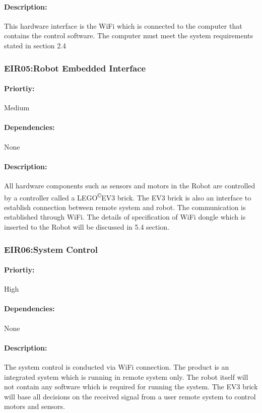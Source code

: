 \documentclass[10pt,a4paper,titlepage]{article}
\newcommand{\cpright}{\textsuperscript{\tiny\copyright}}
\begin{document}
	\paragraph{Description:} This hardware interface is the WiFi which is connected to the computer that contains the control software. The computer must meet the system requirements stated in section 2.4
	
	\subsubsection*{EIR05:Robot Embedded Interface}
	\paragraph{Priortiy:} Medium
	\paragraph{Dependencies:} None
	\paragraph{Description:} All hardware components such as sensors and motors in the Robot are controlled by a controller called a LEGO\cpright EV3 brick. The EV3 brick is also an interface to establish connection between remote system and robot. The communication is established through WiFi. The details of specification of WiFi dongle which is inserted to the Robot will be discussed in 5.4 section.
	
	\subsubsection*{EIR06:System Control}
	\paragraph{Priortiy:} High
	\paragraph{Dependencies:} None
	\paragraph{Description:} The system control is conducted via WiFi connection. The product is an integrated system which is running in remote system only. The robot itself will not contain any software which is required for running the system. The EV3 brick will base all decisions on the received signal from a user remote system to control motors and sensors.	
	
\end{document}
